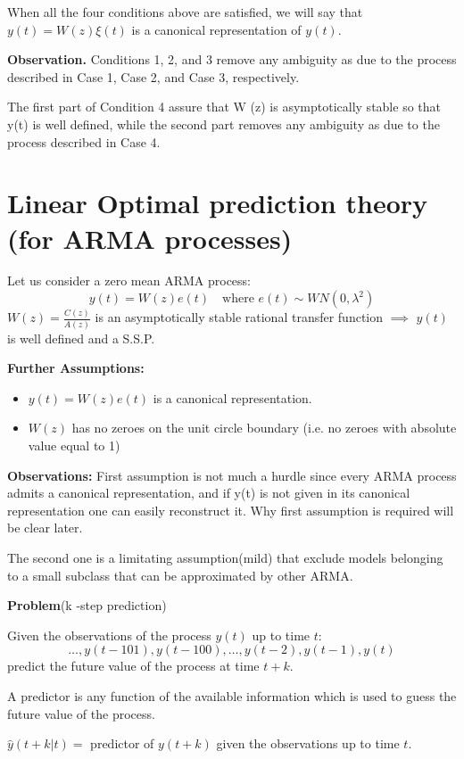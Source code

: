 When all the four conditions above are satisfied, we will say that 
$y(t) = W (z)\xi(t)$ is a canonical representation of $y(t)$.

\textbf{Observation.} Conditions 1, 2, and 3 remove any ambiguity as due to the process 
described in Case 1, Case 2, and Case 3, respectively. 

The first part of Condition 4 assure that W (z) is asymptotically stable 
so that y(t) is well defined, while the second part removes any
ambiguity as due to the process described in Case 4.


\section{Linear Optimal prediction theory (for ARMA processes) }
Let us consider a zero mean ARMA process:
$$ y(t) =W (z) e(t)  \quad \text{where }e(t)\sim W N(0,\lambda^{2} )$$
$W(z)=\frac{C(z)}{A(z)}$ is an asymptotically stable rational transfer function $\implies$ $y(t)$ is well defined and a S.S.P.

\textbf{Further Assumptions:}
\begin{itemize}
	\item $y(t) =W (z) e(t)$ is a canonical representation.
	\item $W(z)$ has no zeroes on the unit circle boundary (i.e. no 
	zeroes with absolute value equal to 1)
\end{itemize}
 
\textbf{Observations:}
First assumption is not much a hurdle since every ARMA
process admits a canonical representation, and if y(t) is not given in 
its canonical representation one can easily reconstruct it. Why 
first assumption is required will be clear later. 

The second one is a limitating assumption(mild) that exclude models belonging to a small subclass that can be approximated by other ARMA.

\textbf{Problem}(k -step prediction) 

Given the observations of the process $y(t)$ up to time $t$:
$$
\ldots , y(t-101), y(t-100), \ldots , y(t-2), y(t-1), y(t)
$$
predict the future value of the process at time $t + k$.


A predictor is any function of the available information which is used 
to guess the future value of the process.

$\hat{y}(t + k | t) =$ predictor of $y(t + k)$ given the observations up to time $t$.


